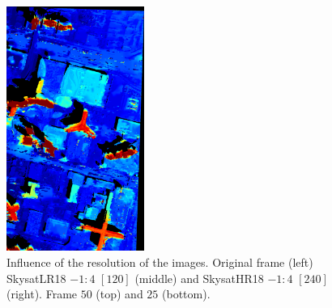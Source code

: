 \documentclass{article}
\theoremstyle{definition}
\begin{document}
\begin{figure}[ht]
 \includegraphics[height=8cm]{images/SkysatHR18_240/1521744514157_dmap_025.png}
 \caption{Influence of the resolution of the images. Original frame (left) SkysatLR18 $-1:4$ $[120]$ (middle) and SkysatHR18 $-1:4$ $[240]$ (right). Frame $50$ (top) and $25$ (bottom).}
 \label{fig:influenceres}
\end{figure}
\end{document}
